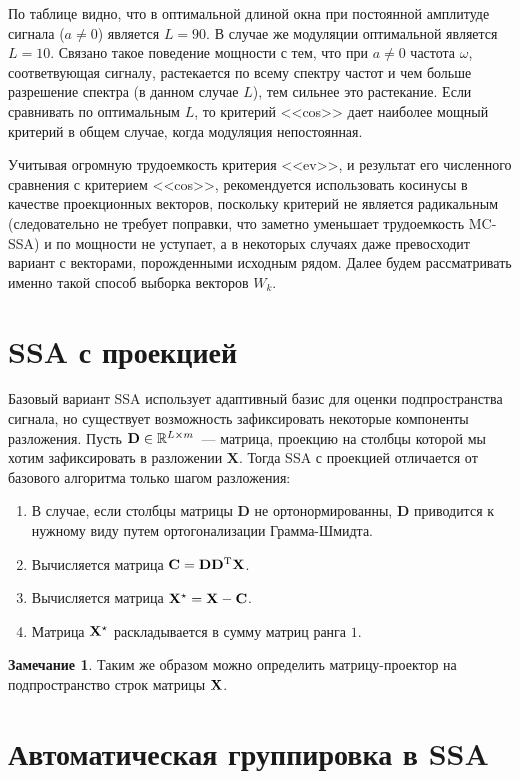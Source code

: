 \documentclass[specialist,
substylefile = spbu_report.rtx,
subf,href,colorlinks=true, 12pt]{disser}
\theoremstyle{definition}
\newtheorem{remark}{Замечание}[chapter]
\begin{document}
По таблице видно, что в оптимальной длиной окна при постоянной амплитуде сигнала ($a\ne0$) является $L=90$. В случае же модуляции оптимальной является $L=10$. Связано такое поведение мощности с тем, что при $a\ne0$ частота $\omega$, соответвующая сигналу, растекается по всему спектру частот и чем больше разрешение спектра (в данном случае $L$), тем сильнее это растекание. Если сравнивать по оптимальным $L$, то критерий <<cos>> дает наиболее мощный критерий в общем случае, когда модуляция непостоянная.

Учитывая огромную трудоемкость критерия <<ev>>, и результат его численного сравнения с критерием <<cos>>, рекомендуется использовать косинусы в качестве проекционных векторов, поскольку критерий не является радикальным (следовательно не требует поправки, что заметно уменьшает трудоемкость MC-SSA) и по мощности не уступает, а в некоторых случаях даже превосходит вариант с векторами, порожденными исходным рядом. Далее будем рассматривать именно такой способ выборка векторов $W_k$.

\section{SSA с проекцией}
Базовый вариант SSA использует адаптивный базис для оценки подпространства сигнала, но существует возможность зафиксировать некоторые компоненты разложения. Пусть $\mathbf{D}\in\mathbb{R}^{L\times m}$~--- матрица, проекцию на столбцы которой мы хотим зафиксировать в разложении $\mathbf{X}$. Тогда SSA с проекцией отличается от базового алгоритма только шагом разложения:
\begin{enumerate}
    \item В случае, если столбцы матрицы $\mathbf{D}$ не ортонормированны, $\mathbf{D}$ приводится к нужному виду путем ортогонализации Грамма-Шмидта.
    \item Вычисляется матрица $\mathbf{C}=\mathbf{D}\mathbf{D}^{\mathrm{T}}\mathbf{X}$.
    \item Вычисляется матрица $\mathbf{X}^\star=\mathbf{X}-\mathbf{C}$.
    \item Матрица $\mathbf{X}^\star$ раскладывается в сумму матриц ранга $1$.
\end{enumerate}

\begin{remark}
	Таким же образом можно определить матрицу-проектор на подпространство строк матрицы $\mathbf{X}$.
\end{remark}

\section{Автоматическая группировка в SSA}\label{sect:grouping_auto}
\end{document}
